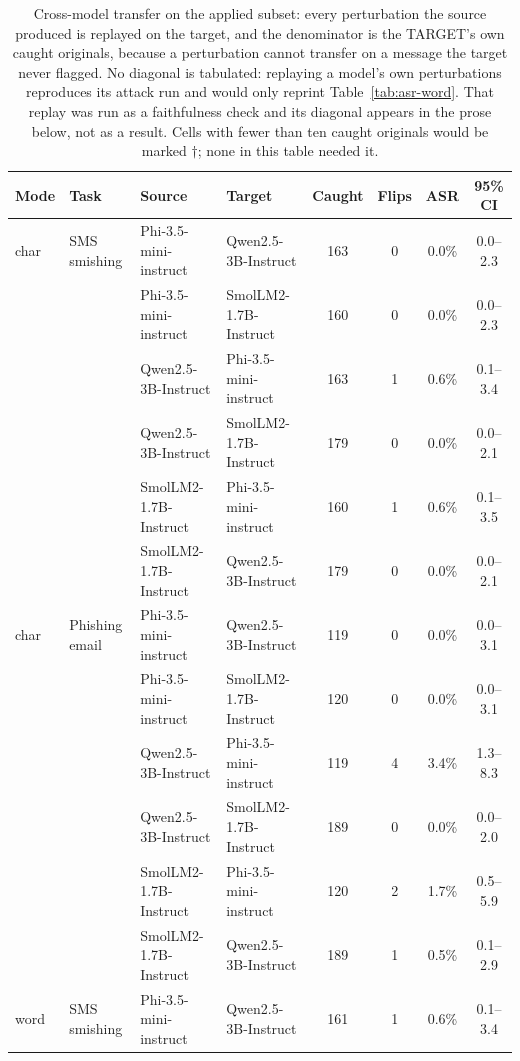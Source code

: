\begin{table}[t]
\centering
\small
\caption{Cross-model transfer on the applied subset: every perturbation the source produced is replayed on the target, and the denominator is the TARGET's own caught originals, because a perturbation cannot transfer on a message the target never flagged. No diagonal is tabulated: replaying a model's own perturbations reproduces its attack run and would only reprint Table~\ref{tab:asr-word}. That replay was run as a faithfulness check and its diagonal appears in the prose below, not as a result. Cells with fewer than ten caught originals would be marked $\dagger$; none in this table needed it.}
\label{tab:transfer}
\begin{tabular}{llllcccc}
\toprule
\textbf{Mode} & \textbf{Task} & \textbf{Source} & \textbf{Target} & \textbf{Caught} & \textbf{Flips} & \textbf{ASR} & \textbf{95\% CI} \\
\midrule
 char & SMS smishing & Phi-3.5-mini-instruct & Qwen2.5-3B-Instruct & 163 & 0 & 0.0\% & 0.0--2.3 \\
  &  & Phi-3.5-mini-instruct & SmolLM2-1.7B-Instruct & 160 & 0 & 0.0\% & 0.0--2.3 \\
  &  & Qwen2.5-3B-Instruct & Phi-3.5-mini-instruct & 163 & 1 & 0.6\% & 0.1--3.4 \\
  &  & Qwen2.5-3B-Instruct & SmolLM2-1.7B-Instruct & 179 & 0 & 0.0\% & 0.0--2.1 \\
  &  & SmolLM2-1.7B-Instruct & Phi-3.5-mini-instruct & 160 & 1 & 0.6\% & 0.1--3.5 \\
  &  & SmolLM2-1.7B-Instruct & Qwen2.5-3B-Instruct & 179 & 0 & 0.0\% & 0.0--2.1 \\
 char & Phishing email & Phi-3.5-mini-instruct & Qwen2.5-3B-Instruct & 119 & 0 & 0.0\% & 0.0--3.1 \\
  &  & Phi-3.5-mini-instruct & SmolLM2-1.7B-Instruct & 120 & 0 & 0.0\% & 0.0--3.1 \\
  &  & Qwen2.5-3B-Instruct & Phi-3.5-mini-instruct & 119 & 4 & 3.4\% & 1.3--8.3 \\
  &  & Qwen2.5-3B-Instruct & SmolLM2-1.7B-Instruct & 189 & 0 & 0.0\% & 0.0--2.0 \\
  &  & SmolLM2-1.7B-Instruct & Phi-3.5-mini-instruct & 120 & 2 & 1.7\% & 0.5--5.9 \\
  &  & SmolLM2-1.7B-Instruct & Qwen2.5-3B-Instruct & 189 & 1 & 0.5\% & 0.1--2.9 \\
\midrule
 word & SMS smishing & Phi-3.5-mini-instruct & Qwen2.5-3B-Instruct & 161 & 1 & 0.6\% & 0.1--3.4 \\

\end{tabular}
\end{table}
